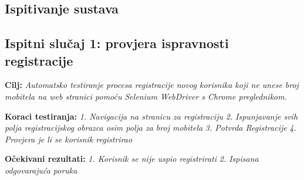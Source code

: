 			\subsection{Ispitivanje sustava}



			\subsection{Ispitni slučaj 1: provjera ispravnosti registracije}

                                                            \textbf{Cilj:}
                                                            \textit{Automatsko testiranje procesa registracije novog korisnika koji ne unese broj mobitela na web stranici pomoću Selenium WebDriver s Chrome preglednikom.}

                                                            \textbf{Koraci testiranja:}
                                                            \textit{1. Navigacija na stranicu za registraciju}
                                                            \textit{2. Ispunjavanje svih polja registracijskog obrazca osim polja za broj mobitela}
                                                            \textit{3. Potvrda Registracije}
                                                            \textit{4. Provjera je li se korisnik registrirao}


                                                            \textbf{Očekivani rezultati:}
                                                            \textit{1. Korisnik se nije uspio registrirati}
                                                            \textit{2. Ispisana odgovarajuća poruka}


